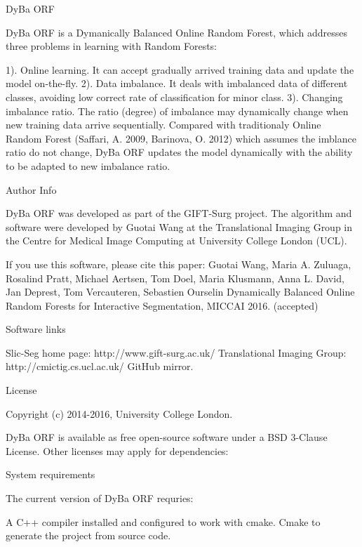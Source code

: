 Dy\+Ba O\+RF \begin{DoxyVerb}DyBa ORF is a Dymanically Balanced Online Random Forest, which addresses three problems in learning with Random Forests: 

1). Online learning. It can accept gradually arrived training data and update the model on-the-fly.
2). Data imbalance. It deals with imbalanced data of different classes, avoiding low correct rate of classification for minor class.
3). Changing imbalance ratio. The ratio (degree) of imbalance may dynamically change when new training data arrive sequentially. Compared with traditionaly Online Random Forest (Saffari, A. 2009, Barinova, O. 2012) which assumes the imblance ratio do not change,
DyBa ORF updates the model dynamically with the ability to be adapted to new imbalance ratio.
\end{DoxyVerb}


Author Info \begin{DoxyVerb}DyBa ORF was developed as part of the GIFT-Surg project. The algorithm and software were developed by Guotai Wang at the Translational Imaging Group in the Centre for Medical Image Computing at University College London (UCL).

If you use this software, please cite this paper:
Guotai Wang, Maria A. Zuluaga, Rosalind Pratt, Michael Aertsen, Tom Doel, Maria Klusmann, Anna L. David, Jan Deprest, Tom Vercauteren, Sebastien Ourselin
Dynamically Balanced Online Random Forests for Interactive Segmentation, MICCAI 2016. (accepted)
\end{DoxyVerb}


Software links \begin{DoxyVerb}Slic-Seg home page: http://www.gift-surg.ac.uk/
Translational Imaging Group: http://cmictig.cs.ucl.ac.uk/
GitHub mirror.
\end{DoxyVerb}


License \begin{DoxyVerb}Copyright (c) 2014-2016, University College London.

DyBa ORF is available as free open-source software under a BSD 3-Clause License. Other licenses may apply for dependencies:
\end{DoxyVerb}


System requirements \begin{DoxyVerb}The current version of DyBa ORF requries:

A C++ compiler installed and configured to work with cmake.
Cmake to generate the project from source code.
\end{DoxyVerb}



